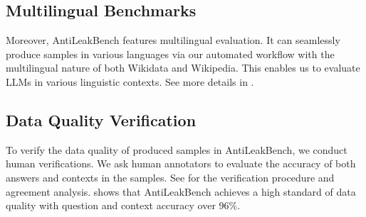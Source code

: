 \documentclass[11pt]{article}
\newcommand{\benchname}{{AntiLeakBench}\xspace}
\begin{document}
    \subsection{Multilingual Benchmarks}
        Moreover, \benchname features multilingual evaluation.
        It can seamlessly produce samples in various languages
        via our automated workflow with the multilingual nature of both Wikidata and Wikipedia.
        This enables us to evaluate LLMs in various linguistic contexts.
        See more details in .




    \subsection{Data Quality Verification} \label{sec_human_verifycation}
        To verify the data quality of produced samples in \benchname, we conduct human verifications.
        We ask human annotators to evaluate the accuracy of both answers and contexts in the samples.
        See  for the verification procedure and agreement analysis.
         shows that \benchname achieves a high standard of data quality with question and context accuracy over 96\%.





\end{document}
